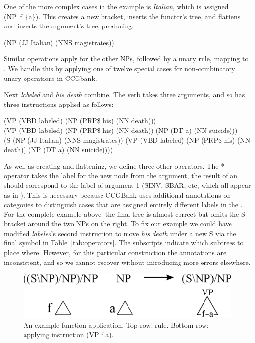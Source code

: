 One of the more complex cases in the example is \textit{Italian}, which is
assigned (NP~f~\{a\}). This creates a new bracket, inserts the functor's tree, and
flattens and inserts the argument's tree, producing:

\vspace{3mm}
\noindent
(NP (JJ Italian) (NNS magistrates))
\vspace{3mm}

Similar operations apply for the other NPs, followed by a unary rule,
mapping  to .  We handle this by applying one of twelve special
cases for non-combinatory unary operations in CCGbank.

Next \textit{labeled} and \textit{his death} combine.  The verb takes three
arguments, and so has three instructions applied as follows:

\vspace{3mm}
\noindent
(VP (VBD labeled) (NP (PRP\$ his) (NN death))) \\
(VP (VBD labeled) (NP (PRP\$ his) (NN death)) (NP (DT a) (NN suicide))) \\
(S (NP (JJ Italian) (NNS magistrates)) (VP (VBD labeled) (NP (PRP\$ his) (NN death)) (NP (DT a) (NN suicide))))
\vspace{3mm}

As well as creating and flattening, we define three other operators.
The * operator takes the label for the new node from the argument,
\myeg the result of an  should correspond to the label of
argument 1 (SINV, SBAR, etc, which all appear as  in \ccg).
This is necessary because CCGBank uses additional annotations on categories to distinguish cases that are assigned entirely different labels in the \ptb.
For the complete example above, the final tree is almost correct but omits the S bracket around the two NPs on the right.
To fix our example we could have modified \textit{labeled}'s second instruction to move \textit{his death} under a new S via the final symbol in Table~\ref{tab:operators}.
The subscripts indicate which subtrees to place where.
However, for this particular construction the \ptb annotations are inconsistent, and so we cannot recover without introducing more errors elsewhere.

\begin{figure}
\centering
\includegraphics[width=0.85\linewidth]{figures/ccg-example}
\caption{\label{fig:inst-example}
An example function application.
Top row: \ccg rule.
Bottom row: applying instruction (VP f a).
}
\end{figure}


